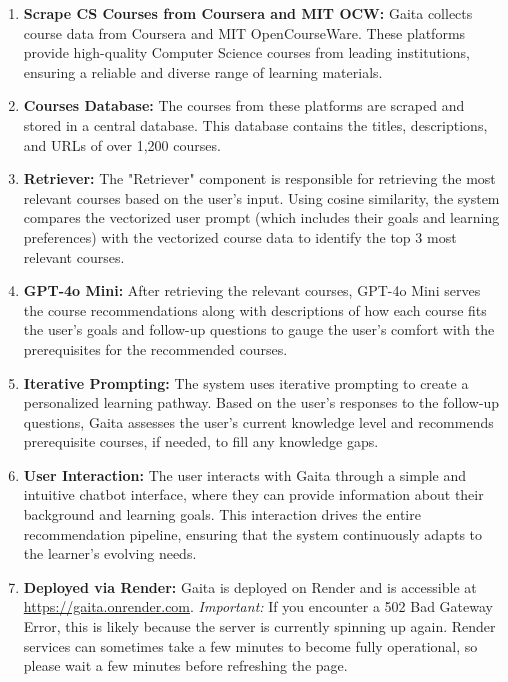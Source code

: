 \begin{enumerate}
\item \textbf{Scrape CS Courses from Coursera and MIT OCW:} Gaita collects course data from Coursera and MIT OpenCourseWare. These platforms provide high-quality Computer Science courses from leading institutions, ensuring a reliable and diverse range of learning materials.  

\item \textbf{Courses Database:} The courses from these platforms are scraped and stored in a central database. This database contains the titles, descriptions, and URLs of over 1,200 courses.

\item \textbf{Retriever:} The "Retriever" component is responsible for retrieving the most relevant courses based on the user’s input. Using cosine similarity, the system compares the vectorized user prompt (which includes their goals and learning preferences) with the vectorized course data to identify the top 3 most relevant courses.


\item \textbf{GPT-4o Mini:} After retrieving the relevant courses, GPT-4o Mini serves the course recommendations along with descriptions of how each course fits the user’s goals and follow-up questions to gauge the user's comfort with the prerequisites for the recommended courses. 

\item \textbf{Iterative Prompting:} The system uses iterative prompting to create a personalized learning pathway. Based on the user's responses to the follow-up questions, Gaita assesses the user’s current knowledge level and recommends prerequisite courses, if needed, to fill any knowledge gaps. 

\item \textbf{User Interaction:} The user interacts with Gaita through a simple and intuitive chatbot interface, where they can provide information about their background and learning goals. This interaction drives the entire recommendation pipeline, ensuring that the system continuously adapts to the learner's evolving needs.

\item \textbf{Deployed via Render:} Gaita is deployed on Render and is accessible at \url{https://gaita.onrender.com}. \textit{Important:} If you encounter a 502 Bad Gateway Error, this is likely because the server is currently spinning up again. Render services can sometimes take a few minutes to become fully operational, so please wait a few minutes before refreshing the page.


\end{enumerate}


